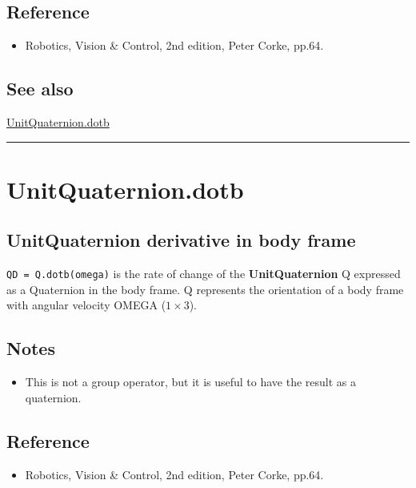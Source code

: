\subsection*{Reference}
\begin{itemize}
  \item Robotics, Vision \& Control, 2nd edition, Peter Corke, pp.64.
\end{itemize}

\subsection*{See also}


\hyperlink{UnitQuaternion.dotb}{\color{blue} UnitQuaternion.dotb}

\vspace{1.5ex}\hrule

\hypertarget{UnitQuaternion.dotb}{\section*{UnitQuaternion.dotb}}
\subsection*{UnitQuaternion derivative in body frame}


\texttt{QD = Q.dotb(omega)} is the rate of change of the \textbf{\color{red} UnitQuaternion} Q expressed
as a Quaternion in the body frame. Q represents the orientation of a body
frame with angular velocity OMEGA ($1 \times 3$).


\subsection*{Notes}
\begin{itemize}
  \item This is not a group operator, but it is useful to have the result as a    quaternion.
\end{itemize}

\subsection*{Reference}
\begin{itemize}
  \item Robotics, Vision \& Control, 2nd edition, Peter Corke, pp.64.
\end{itemize}

